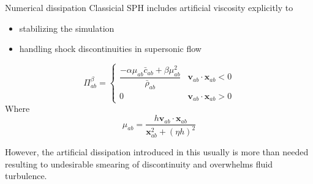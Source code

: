 \documentclass{beamer}
\begin{document}
\begin{frame}{Numerical dissipation}
Classicial SPH includes artificial viscosity explicitly to 
\begin{itemize}
\item stabilizing the simulation 
\item handling shock discontinuities in supersonic flow
\end{itemize}
\begin{equation}
\Pi_{ab}^{\beta} = 
\begin{cases} 
      \dfrac{- \alpha \mu_{ab} \bar{c}_{ab} + \beta \mu_{ab}^2} {\bar{\rho}_{ab}} & \textbf{v}_{ab} \cdot \textbf{x}_{ab} < 0\\
      0 & \textbf{v}_{ab} \cdot \textbf{x}_{ab} > 0
\end{cases}
\label{eq:art-vis-shock}
\end{equation}
Where
\begin{equation}
\mu_{ab} = \dfrac{h \textbf{v}_{ab} \cdot \textbf{x}_{ab}}{\textbf{x}_{ab}^2 + \left(\eta h\right)^2} 
\end{equation}

However, the artificial dissipation introduced in this usually is more than needed resulting to undesirable smearing of discontinuity and overwhelms fluid turbulence.
\end{frame}
\end{document}
